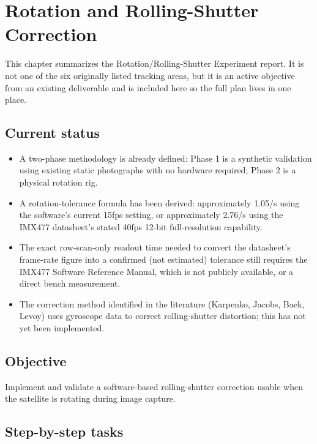 \chapter{Rotation and Rolling-Shutter Correction}
\label{chap:rolling-shutter}

This chapter summarizes the Rotation/Rolling-Shutter Experiment report. It is not one of the six originally listed tracking areas, but it is an active objective from an existing deliverable and is included here so the full plan lives in one place.

\section{Current status}

\begin{itemize}
    \item A two-phase methodology is already defined: Phase 1 is a synthetic validation using existing static photographs with no hardware required; Phase 2 is a physical rotation rig.
    \item A rotation-tolerance formula has been derived: approximately 1.05\textdegree/s using the software's current 15fps setting, or approximately 2.76\textdegree/s using the IMX477 datasheet's stated 40fps 12-bit full-resolution capability.
    \item The exact row-scan-only readout time needed to convert the datasheet's frame-rate figure into a confirmed (not estimated) tolerance still requires the IMX477 Software Reference Manual, which is not publicly available, or a direct bench measurement.
    \item The correction method identified in the literature (Karpenko, Jacobs, Baek, Levoy) uses gyroscope data to correct rolling-shutter distortion; this has not yet been implemented.
\end{itemize}

\section{Objective}

Implement and validate a software-based rolling-shutter correction usable when the satellite is rotating during image capture.

\section{Step-by-step tasks}

